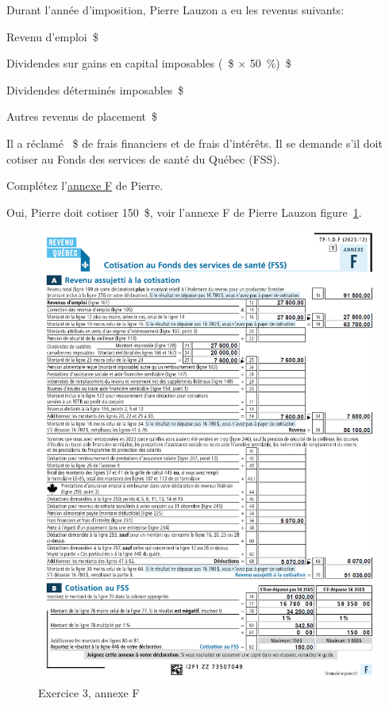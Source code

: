 \begin{question}
	Durant l'année d'imposition, Pierre Lauzon a eu les revenus suivants:
	
	Revenu d'emploi\dotfill{}~\$
	
	Dividendes sur gains en capital imposables (~\$ $\times$ 50~\%)\dotfill{}~\$
	
	Dividendes déterminés imposables\dotfill{}~\$
	
	Autres revenus de placement\dotfill{}~\$
	
	Il a réclamé ~\$ de frais financiers et de frais d'intérêts. Il se demande s'il doit cotiser au Fonds des services de santé du Québec (FSS).
\end{question}

\setcounter{sousQuestion}{0}
\begin{sousQuestion}
	Complétez l'\href{https://www.revenuquebec.ca/documents/fr/formulaires/tp/2023-12/TP-1.D.F%282023-12%29.pdf}{annexe F} de Pierre.
\end{sousQuestion}
Oui, Pierre doit cotiser 150~\$, voir l'annexe F de Pierre Lauzon figure~\ref{fig:chap6Exercice3annexeF}.

\begin{figure}
	\centering
	\includegraphics[width=.9\textwidth]{exercice/6-3/Q5/annexeF.png}
	\caption[]{Exercice 3, annexe F}
	\label{fig:chap6Exercice3annexeF}
\end{figure}

